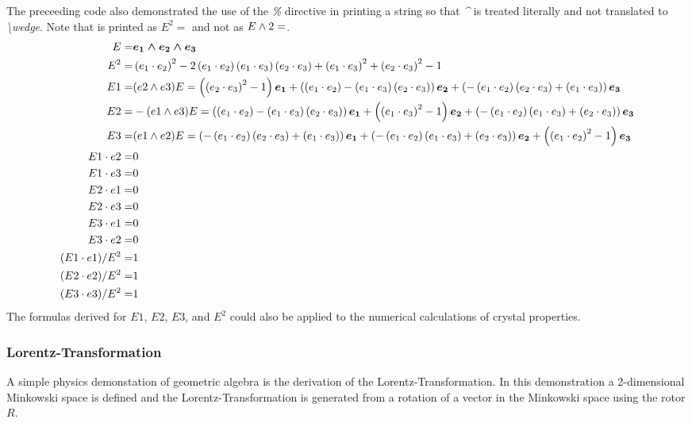 \documentclass[letterpaper,10pt,english]{sphinxmanual}
\begin{document}
The preceeding code also demonstrated the use of the \emph{\%} directive in
printing a string so that \emph{\textasciicircum{}} is treated literally and not translated
to \emph{\textbackslash{}wedge}. Note that  is printed as $E^{2} =$
and not as $E\wedge {2} =$.
  \begin{align*}
  E =& \boldsymbol{e_{1}\wedge e_{2}\wedge e_{3}} \\
  E^{2} =& \left ( e_{1}\cdot e_{2}\right ) ^{2} - 2 \left ( e_{1}\cdot e_{2}\right )  \left ( e_{1}\cdot e_{3}\right )  \left ( e_{2}\cdot e_{3}\right )  + \left ( e_{1}\cdot e_{3}\right ) ^{2} + \left ( e_{2}\cdot e_{3}\right ) ^{2} -1 \\
  E1 =& (e2\wedge e3) E = \left ( \left ( e_{2}\cdot e_{3}\right ) ^{2} -1\right ) \boldsymbol{e_{1}}+\left ( \left ( e_{1}\cdot e_{2}\right )  - \left ( e_{1}\cdot e_{3}\right )  \left ( e_{2}\cdot e_{3}\right ) \right ) \boldsymbol{e_{2}}+\left ( - \left ( e_{1}\cdot e_{2}\right )  \left ( e_{2}\cdot e_{3}\right )  + \left ( e_{1}\cdot e_{3}\right ) \right ) \boldsymbol{e_{3}} \\
  E2 =& -(e1\wedge e3) E = \left ( \left ( e_{1}\cdot e_{2}\right )  - \left ( e_{1}\cdot e_{3}\right )  \left ( e_{2}\cdot e_{3}\right ) \right ) \boldsymbol{e_{1}}+\left ( \left ( e_{1}\cdot e_{3}\right ) ^{2} -1\right ) \boldsymbol{e_{2}}+\left ( - \left ( e_{1}\cdot e_{2}\right )  \left ( e_{1}\cdot e_{3}\right )  + \left ( e_{2}\cdot e_{3}\right ) \right ) \boldsymbol{e_{3}} \\
  E3 =& (e1\wedge e2) E = \left ( - \left ( e_{1}\cdot e_{2}\right )  \left ( e_{2}\cdot e_{3}\right )  + \left ( e_{1}\cdot e_{3}\right ) \right ) \boldsymbol{e_{1}}+\left ( - \left ( e_{1}\cdot e_{2}\right )  \left ( e_{1}\cdot e_{3}\right )  + \left ( e_{2}\cdot e_{3}\right ) \right ) \boldsymbol{e_{2}}+\left ( \left ( e_{1}\cdot e_{2}\right ) ^{2} -1\right ) \boldsymbol{e_{3}} \\
  E1\cdot e2 =& 0 \\
  E1\cdot e3 =& 0 \\
  E2\cdot e1 =& 0 \\
  E2\cdot e3 =& 0 \\
  E3\cdot e1 =& 0 \\
  E3\cdot e2 =& 0 \\
  (E1\cdot e1)/E^{2} =& 1 \\
  (E2\cdot e2)/E^{2} =& 1 \\
  (E3\cdot e3)/E^{2} =& 1
  \end{align*}
The formulas derived for $E1$, $E2$, $E3$, and $E^{2}$ could
also be applied to the numerical calculations of crystal properties.


\subsubsection{Lorentz-Transformation}
\label{GA:lorentz-transformation}
A simple physics demonstation of geometric algebra is the derivation of
the Lorentz-Transformation.  In this demonstration a 2-dimensional
Minkowski space is defined and the Lorentz-Transformation is generated
from a rotation of a vector in the Minkowski space using the rotor
$R$.
\end{document}
